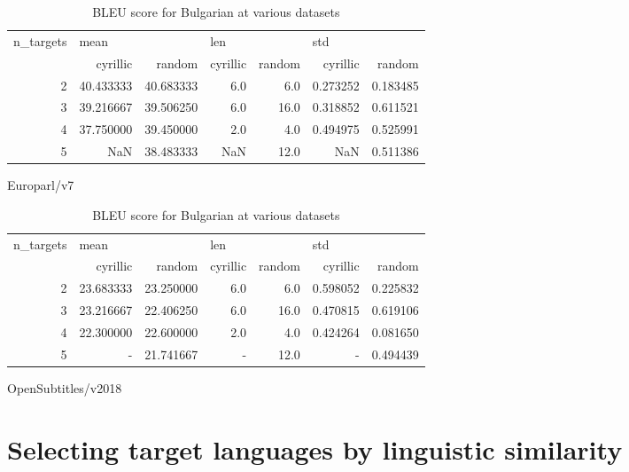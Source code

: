 \begin{table}[h]
\begin{subtable}[t]{1\linewidth}
\begin{tabular}{rrrrrrr}
\toprule
n\_targets & \multicolumn{2}{l}{mean} & \multicolumn{2}{l}{len} & \multicolumn{2}{l}{std} \\
          &   cyrillic &     random & cyrillic & random &  cyrillic &    random \\
\midrule
        2 &  40.433333 &  40.683333 &      6.0 &    6.0 &  0.273252 &  0.183485 \\
        3 &  39.216667 &  39.506250 &      6.0 &   16.0 &  0.318852 &  0.611521 \\
        4 &  37.750000 &  39.450000 &      2.0 &    4.0 &  0.494975 &  0.525991 \\
        5 &        NaN &  38.483333 &      NaN &   12.0 &       NaN &  0.511386 \\
\bottomrule
\end{tabular}
\caption{Europarl/v7}
\label{ table:bg/Europarl/v7 }
\end{subtable}
\begin{subtable}[t]{1\linewidth}
\begin{tabular}{rrrrrrr}
\toprule
n\_targets & \multicolumn{2}{l}{mean} & \multicolumn{2}{l}{len} & \multicolumn{2}{l}{std} \\
          &   cyrillic &     random & cyrillic & random &  cyrillic &    random \\
\midrule
        2 &  23.683333 &  23.250000 &      6.0 &    6.0 &  0.598052 &  0.225832 \\
        3 &  23.216667 &  22.406250 &      6.0 &   16.0 &  0.470815 &  0.619106 \\
        4 &  22.300000 &  22.600000 &      2.0 &    4.0 &  0.424264 &  0.081650 \\
        5 &          - &  21.741667 &        - &   12.0 &         - &  0.494439 \\
\bottomrule
\end{tabular}
\caption{OpenSubtitles/v2018}
\label{tab:bg/OpenSubtitles/v2018}
\end{subtable}
\caption{BLEU score for Bulgarian at various datasets }
\end{table}

\section{Selecting target languages by linguistic similarity}

